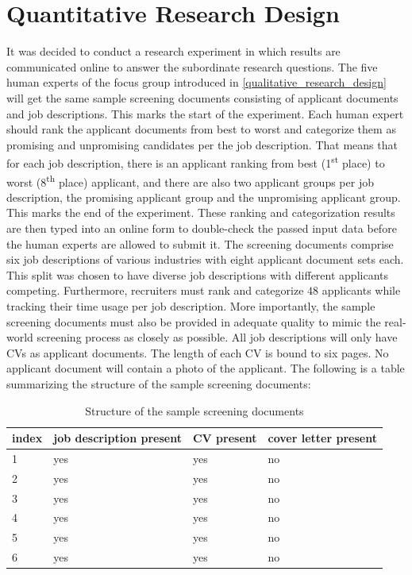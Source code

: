 \documentclass[draft,final]{thesisclass} %
\begin{document}
\section{Quantitative Research Design} \label{quantitative_research_design}
It was decided to conduct a research experiment in which results are communicated online to answer the subordinate research questions.
The five human experts of the focus group introduced in \ref{qualitative_research_design} will get the same sample screening documents consisting of applicant documents and job descriptions.
This marks the start of the experiment.
Each human expert should rank the applicant documents from best to worst and categorize them as promising and unpromising candidates per the job description.
That means that for each job description, there is an applicant ranking from best (1\textsuperscript{st} place) to worst (8\textsuperscript{th} place) applicant, and there are also two applicant groups per job description, the promising applicant group and the unpromising applicant group.
This marks the end of the experiment.
These ranking and categorization results are then typed into an online form to double-check the passed input data before the human experts are allowed to submit it.
The screening documents comprise six job descriptions of various industries with eight applicant document sets each.
This split was chosen to have diverse job descriptions with different applicants competing.
Furthermore, recruiters must rank and categorize $48$ applicants while tracking their time usage per job description.
More importantly, the sample screening documents must also be provided in adequate quality to mimic the real-world screening process as closely as possible.
All job descriptions will only have \acs{CV}s as applicant documents.
The length of each \acs{CV} is bound to six pages.
No applicant document will contain a photo of the applicant.
The following is a table summarizing the structure of the sample screening documents:
\begin{table}[H]
    \begin{tabular}{|l|l|l|l|}
    \hline
    \textbf{index} & \textbf{job description present} & \textbf{\acs{CV} present} & \textbf{cover letter present} \\ \hline
    1 & yes & yes & no \\ \hline
    2 & yes & yes & no \\ \hline
    3 & yes & yes & no \\ \hline
    4 & yes & yes & no \\ \hline
    5 & yes & yes & no \\ \hline
    6 & yes & yes & no \\ \hline
    \end{tabular}
    \caption{Structure of the sample screening documents}
\end{table}
\end{document}
